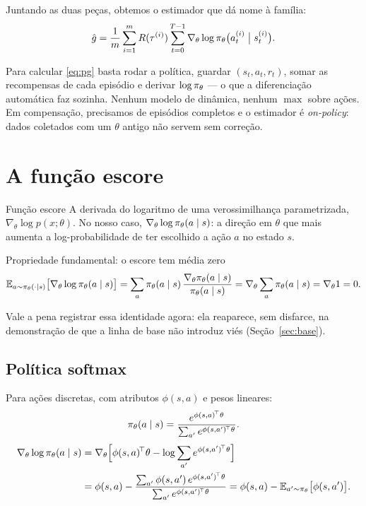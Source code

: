 \documentclass[11pt]{article}
\newcommand{\thv}{\theta}
\newcommand{\polth}{\pol_{\thv}}
\newcommand{\gth}{\nabla_{\thv}}
\newcommand{\traj}{\tau}
\newcommand{\feat}{\phi}
\newcommand{\gscore}{\gth \log \polth(a \mid s)}
\begin{document}
Juntando as duas peças, obtemos o estimador que dá nome à família:
\begin{equation}\label{eq:pg}
  \hat g = \frac{1}{m}\sum_{i=1}^{m} R(\traj^{(i)})
           \sum_{t=0}^{T-1}\gth\log\polth\bigl(a^{(i)}_t \bigm| s^{(i)}_t\bigr).
\end{equation}

\begin{ideiabox}
Para calcular \eqref{eq:pg} basta rodar a política, guardar $(s_t,a_t,r_t)$,
somar as recompensas de cada episódio e derivar $\log\polth$ --- o que a
diferenciação automática faz sozinha. Nenhum modelo de dinâmica, nenhum $\max$
sobre ações. Em compensação, precisamos de episódios completos e o estimador é
\emph{on-policy}: dados coletados com um $\thv$ antigo não servem sem correção.
\end{ideiabox}

\section{A função escore}

\begin{defbox}{Função escore}
A derivada do logaritmo de uma verossimilhança parametrizada,
$\gth\log p(x;\thv)$. No nosso caso, $\gscore$: a direção em $\thv$ que mais
aumenta a log-probabilidade de ter escolhido a ação $a$ no estado $s$.
\end{defbox}

\begin{teobox}{Propriedade fundamental: o escore tem média zero}
\[
  \E_{a\sim\polth(\cdot\mid s)}\bigl[\gscore\bigr]
   = \sum_a \polth(a\mid s)\,\frac{\gth\polth(a\mid s)}{\polth(a\mid s)}
   = \gth\sum_a \polth(a\mid s) = \gth 1 = 0 .
\]
\end{teobox}

Vale a pena registrar essa identidade agora: ela reaparece, sem disfarce, na
demonstração de que a linha de base não introduz viés (Seção~\ref{sec:base}).

\subsection{Política softmax}

Para ações discretas, com atributos $\feat(s,a)$ e pesos lineares:
\[
  \polth(a\mid s) = \frac{e^{\feat(s,a)^{\!\top}\thv}}
                        {\sum_{a'} e^{\feat(s,a')^{\!\top}\thv}} .
\]
\begin{align*}
  \gscore
   &= \gth\Bigl[\feat(s,a)^{\!\top}\thv
      - \log\sum_{a'} e^{\feat(s,a')^{\!\top}\thv}\Bigr]\\
   &= \feat(s,a) - \frac{\sum_{a'}\feat(s,a')\,e^{\feat(s,a')^{\!\top}\thv}}
                        {\sum_{a'} e^{\feat(s,a')^{\!\top}\thv}}
    = \feat(s,a) - \E_{a'\sim\polth}\bigl[\feat(s,a')\bigr] .
\end{align*}
\end{document}
